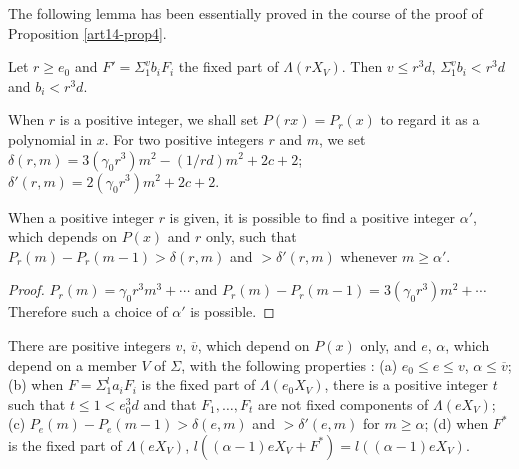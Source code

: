 The following lemma has been essentially proved in the course of the proof of Proposition \ref{art14-prop4}.

\begin{lemma}\label{art14-lem6}
Let $r\geq e_{0}$ and $F'=\Sigma^{v}_{1}b_{i}F_{i}$ the fixed part of $\Lambda (rX_{V})$. Then $v\leq r^{3}d$, $\Sigma^{v}_{1}b_{i}<r^{3}d$ and $b_{i}<r^{3}d$.
\end{lemma}

When $r$ is a positive integer, we shall set $P(rx)=P_{r}(x)$ to regard it as a polynomial in $x$. For two positive integers $r$ and $m$, we set $\delta(r,m)=3(\gamma_{0}r^{3})m^{2}-(1/rd)m^{2}+2c+2$; $\delta'(r,m)=2(\gamma_{0}r^{3})m^{2}+2c+2$.

\begin{lemma}\label{art14-lem7}
When a positive integer $r$ is given, it is possible to find a positive integer $\alpha'$, which depends on $P(x)$ and $r$ only, such that $P_{r}(m)-P_{r}(m-1)>\delta(r,m)$ and $>\delta'(r,m)$ whenever $m\geq \alpha'$.
\end{lemma}

\begin{proof}
$P_{r}(m)=\gamma_{0}r^{3}m^{3}+\cdots$ and $P_{r}(m)-P_{r}(m-1)=3(\gamma_{0}r^{3})m^{2}+\cdots$ Therefore such a choice of $\alpha'$ is possible.
\end{proof}

\begin{proposition}\label{art14-prop6}
There are positive integers $v$, $\overline{v}$, which depend on $P(x)$ only, and $e$, $\alpha$, which depend on a member $V$ of $\Sigma$, with the following properties : {\rm(a)} $e_{0}\leq e\leq v$, $\alpha \leq \overline{v}$; {\rm(b)} when $F=\Sigma^{l}_{1}a_{i}F_{i}$ is the fixed part of $\Lambda(e_{0}X_{V})$, there is a positive integer $t$ such that $t\leq 1<e^{3}_{0}d$ and that $F_{1},\ldots,F_{t}$ are not fixed components of $\Lambda(eX_{V})$; {\rm(c)} $P_{e}(m)-P_{e}(m-1)>\delta (e,m)$ and $>\delta'(e,m)$ for $m\geq \alpha$; {\rm(d)} when $F^{*}$ is the fixed part of $\Lambda(eX_{V})$, $l((\alpha-1)eX_{V}+F^{*})=l((\alpha-1)eX_{V})$.
\end{proposition}

